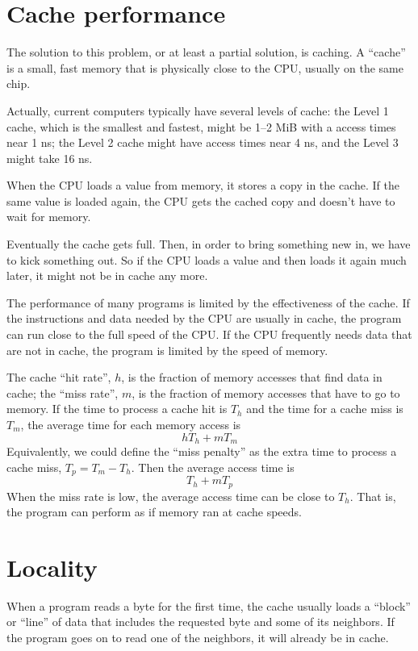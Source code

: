 \documentclass[12pt]{book}
\begin{document}
\section{Cache performance}

The solution to this problem, or at least a partial solution, is
caching.  A ``cache'' is a small, fast memory that is physically close
to the CPU, usually on the same chip.


Actually, current computers typically have several levels of cache: the Level 1 cache, which is the smallest and fastest, might be 1--2 MiB with a access times near 1 ns; the Level 2 cache might have access times near 4 ns, and the Level 3 might take 16 ns.

When the CPU loads a value from memory, it stores a copy in the cache.
If the same value is loaded again, the CPU gets the cached copy
and doesn't have to wait for memory.

Eventually the cache gets full.  Then, in order to bring something
new in, we have to kick something out.  So if the CPU loads a value
and then loads it again much later, it might not be in cache any more.

The performance of many programs is limited by the effectiveness
of the cache.  If the instructions and data needed by the CPU are usually in cache, the program can run close to the full speed of the CPU.  If the CPU
frequently needs data that are not in cache, the program is
limited by the speed of memory.

The cache ``hit rate'', $h$, is the fraction of memory accesses that
find data in cache; the ``miss rate'', $m$, is the fraction of memory
accesses that have to go to memory.  If the time to process a cache
hit is $T_h$ and the time for a cache miss is $T_m$, the average time
for each memory access is
%
\[ h T_h + m T_m \]
%
Equivalently, we could define the ``miss penalty'' as the extra
time to process a cache miss, $T_p = T_m - T_h$.  Then the average access
time is
%
\[ T_h + m T_p \]
%
When the miss rate is low, the average access time can be close to
$T_h$.  That is, the program can perform as if memory ran at
cache speeds.


\section{Locality}

When a program reads a byte for the first time, the cache usually
loads a ``block'' or ``line'' of data that includes the requested
byte and some of its neighbors.  If the program goes on to read one
of the neighbors, it will already be in cache.
\end{document}
